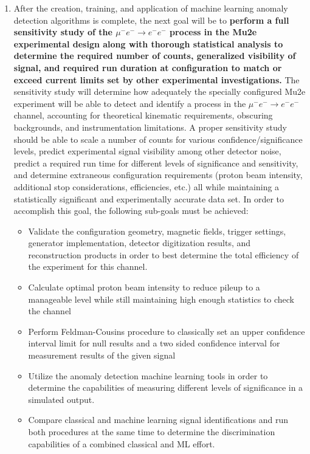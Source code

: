 \documentclass[12pt]{article}
\newcommand{\muEtoEE}{\mu^- e^- \to e^- e^-}
\begin{document}
\begin{enumerate}
    \item \label{goal:SensitivityStudyGoal}After the creation, training, and application of machine learning anomaly detection algorithms is complete, the next goal will be to \textbf{perform a full sensitivity study of the $\muEtoEE$ process in the Mu2e experimental design along with thorough statistical analysis to determine the required number of counts, generalized visibility of signal, and required run duration at configuration to match or exceed current limits set by other experimental investigations.} The sensitivity study will determine how adequately the specially configured Mu2e experiment will be able to detect and identify a process in the $\muEtoEE$ channel, accounting for theoretical kinematic requirements, obscuring backgrounds, and instrumentation limitations. A proper sensitivity study should be able to scale a number of counts for various confidence/significance levels, predict experimental signal visibility among other detector noise, predict a required run time for different levels of significance and sensitivity, and determine extraneous configuration requirements (proton beam intensity, additional stop considerations, efficiencies, etc.) all while maintaining a statistically significant and experimentally accurate data set. In order to accomplish this goal, the following sub-goals must be achieved:
\begin{itemize}
    \item Validate the configuration geometry, magnetic fields, trigger settings, generator implementation, detector digitization results, and reconstruction products in order to best determine the total efficiency of the experiment for this channel.
    \item Calculate optimal proton beam intensity to reduce pileup to a manageable level while still maintaining high enough statistics to check the channel
    \item Perform Feldman-Cousins procedure to classically set an upper confidence interval limit for null results and a two sided confidence interval for measurement results of the given signal \cite{FeldmanCousinsStatistics} 
    \item Utilize the anomaly detection machine learning tools in order to determine the capabilities of measuring different levels of significance in a simulated output.
    \item Compare classical and machine learning signal identifications and run both procedures at the same time to determine the discrimination capabilities of a combined classical and ML effort.

\end{itemize}
\end{enumerate}
\end{document}

